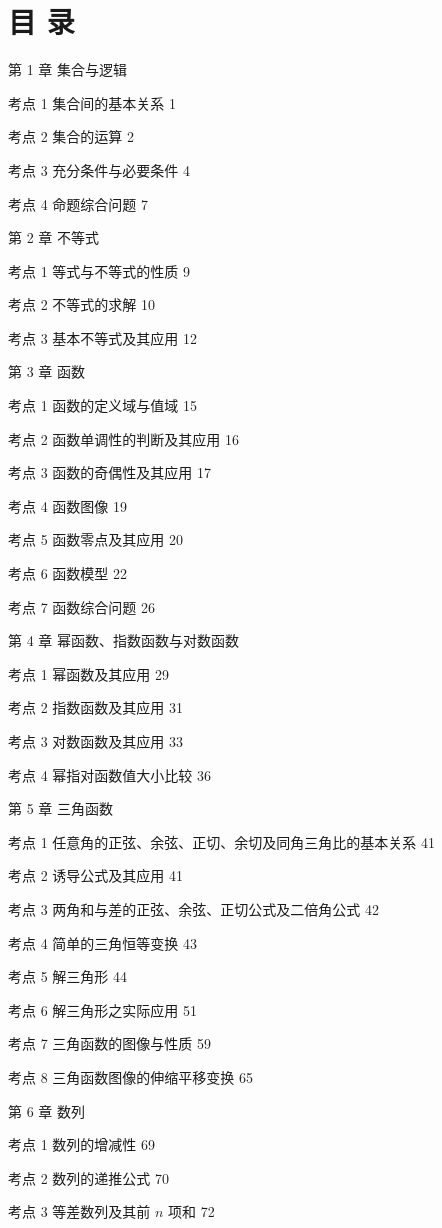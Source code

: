 \section*{目 录}

第 1 章 集合与逻辑

考点 1 集合间的基本关系 1

考点 2 集合的运算 2

考点 3 充分条件与必要条件 4

考点 4 命题综合问题 7

第 2 章 不等式

考点 1 等式与不等式的性质 9

考点 2 不等式的求解 10

考点 3 基本不等式及其应用 12

第 3 章 函数

考点 1 函数的定义域与值域 15

考点 2 函数单调性的判断及其应用 16

考点 3 函数的奇偶性及其应用 17

考点 4 函数图像 19

考点 5 函数零点及其应用 20

考点 6 函数模型 22

考点 7 函数综合问题 26

第 4 章 幂函数、指数函数与对数函数

考点 1 幂函数及其应用 29

考点 2 指数函数及其应用 31

考点 3 对数函数及其应用 33

考点 4 幂指对函数值大小比较 36

第 5 章 三角函数

考点 1 任意角的正弦、余弦、正切、余切及同角三角比的基本关系 41

考点 2 诱导公式及其应用 41

考点 3 两角和与差的正弦、余弦、正切公式及二倍角公式 42

考点 4 简单的三角恒等变换 43

考点 5 解三角形 44

考点 6 解三角形之实际应用 51

考点 7 三角函数的图像与性质 59

考点 8 三角函数图像的伸缩平移变换 65

第 6 章 数列

考点 1 数列的增减性 69

考点 2 数列的递推公式 70

考点 3 等差数列及其前 $n$ 项和 72

